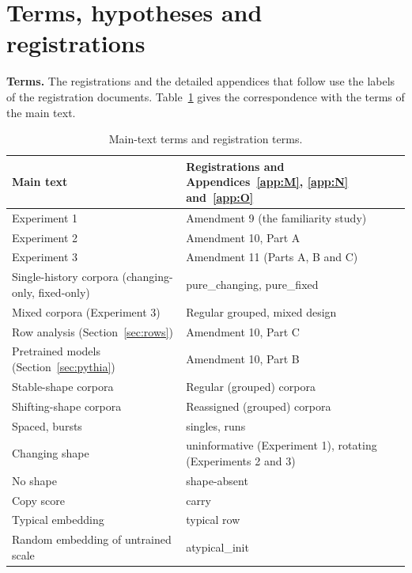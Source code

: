 \FloatBarrier
\section{Terms, hypotheses and registrations}\label{app:map}
\setcounter{table}{0}

\textbf{Terms.} The registrations and the detailed appendices that follow use the labels of the registration documents. Table~\ref{tab:terms} gives the correspondence with the terms of the main text.

\begin{table}[!htbp]
\centering\small
\caption{Main-text terms and registration terms.}
\label{tab:terms}
\begin{tabular}{@{}ll@{}}
\toprule
Main text & Registrations and Appendices~\ref{app:M}, \ref{app:N} and~\ref{app:O} \\
\midrule
Experiment 1 & Amendment 9 (the familiarity study) \\
Experiment 2 & Amendment 10, Part A \\
Experiment 3 & Amendment 11 (Parts A, B and C) \\
Single-history corpora (changing-only, fixed-only) & pure\_changing, pure\_fixed \\
Mixed corpora (Experiment 3) & Regular grouped, mixed design \\
Row analysis (Section~\ref{sec:rows}) & Amendment 10, Part C \\
Pretrained models (Section~\ref{sec:pythia}) & Amendment 10, Part B \\
Stable-shape corpora & Regular (grouped) corpora \\
Shifting-shape corpora & Reassigned (grouped) corpora \\
Spaced, bursts & singles, runs \\
Changing shape & uninformative (Experiment 1), rotating (Experiments 2 and 3) \\
No shape & shape-absent \\
Copy score & carry \\
Typical embedding & typical row \\
Random embedding of untrained scale & atypical\_init \\
\bottomrule
\end{tabular}
\end{table}

